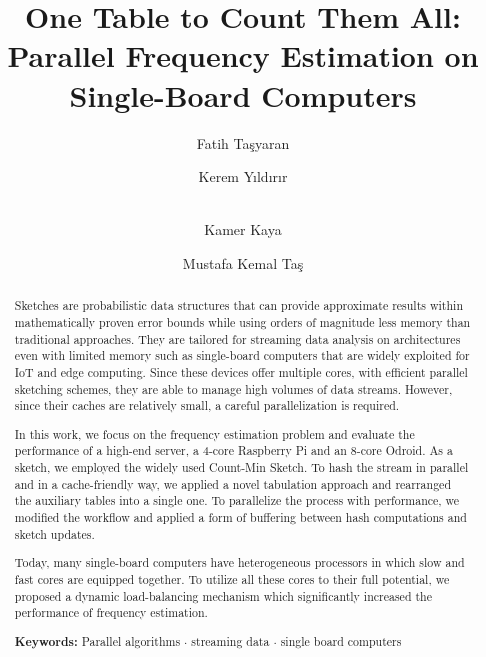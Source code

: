 \documentclass[runningheads]{llncs}
\begin{document}
\title{One Table to Count Them All:\\Parallel Frequency Estimation on Single-Board Computers}

\author{Fatih Ta\c{s}yaran \and
Kerem Y{\i}ld{\i}r{\i}r\and \\ 
Kamer Kaya \and Mustafa Kemal Ta\c{s} }

\maketitle            
\begin{abstract}
\begin{sloppypar}
Sketches are probabilistic data structures that can provide approximate results within mathematically proven error bounds while using orders of magnitude less memory than traditional approaches. They are tailored for streaming data analysis on architectures even with limited memory such as single-board computers that are widely exploited for IoT and edge computing. Since these devices offer multiple cores, with efficient parallel sketching schemes, they are able to manage high volumes of data streams. However, since their caches are relatively small, a careful parallelization is required.

In this work, we focus on the frequency estimation problem and evaluate the performance of a high-end server, a 4-core Raspberry Pi and an 8-core Odroid. As a sketch, we employed the widely used Count-Min Sketch. 
To hash the stream in parallel and in a cache-friendly way, we applied a novel tabulation approach and rearranged the auxiliary tables into a single one. To parallelize the process with performance, we modified the workflow and applied a form of buffering between hash computations and sketch updates. 

Today, many single-board computers have heterogeneous processors in which slow and fast cores are equipped together. To utilize all these cores to their full potential, we proposed a dynamic load-balancing mechanism which significantly increased the performance of frequency estimation. 

\vspace{3mm}
\textbf{Keywords: } Parallel algorithms $\cdot$ streaming data $\cdot$ single board computers
\end{sloppypar}
\end{abstract}
\end{document}
